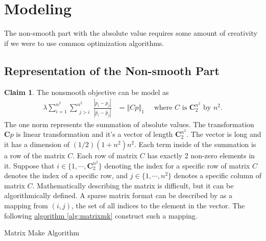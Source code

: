 \documentclass[11pt]{article}
\theoremstyle{definition}
\newtheorem{claim}{Claim}[subsection]
\numberwithin{equation}{subsection}
\begin{document}
\section{Modeling}
    
    The non-smooth part with the absolute value requires some amount of creativity if we were to use common optimization algorithms. 
    \subsection{Representation of the Non-smooth Part}\label{sec:opsplit_model}
        \begin{claim}
            The nonsmooth objective can be model as 
            \begin{align*}
                \lambda \sum_{i=1}^{n^2}\sum_{\substack{j> i}}^{n^2}
                \frac{|p_{i} - p_j|}{|\hat p_{i} - \hat p_j|}
                &= 
                \left\Vert
                    Cp
                \right\Vert_1 \quad 
                \text{ where $C$ is $\mathbf C_2^{n^2}$ by $n^2$}. 
            \end{align*}
            The one norm represents the summation of absolute values. 
            The transformation $\mathbf Cp$ is linear transformation and it's a vector of length $\mathbf C_2^{n^2}$. 
            The vector is long and it has a dimension of $(1/2)(1 +n^2)n^2$. 
            Each term inside of the summation is a row of the matrix $C$. 
            Each row of matrix $C$ has exactly 2 non-zero elements in it. 
            Suppose that $i\in \{1,\cdots,\mathbf C^{n^2}_2\}$ denoting the index for a specific row of matrix $C$ denotes the index of a specific row, and $j\in \{1, \cdots, n^2\}$ denotes a specific column of matrix $C$. 
            Mathematically describing the matrix is difficult, but it can be algorithmically defined.
            A sparse matrix format can be described by as a mapping from $(i,j)$, the set of all indices to the element in the vector. 
            The following 
            \hyperref[alg:matrixmk]{algorithm \ref{alg:matrixmk}}
            construct such a mapping. 
            \begin{algorithm}[H]
                \begin{algorithmic}[1]
                        \ENDIF
                    \ENDFOR
                \ENDFOR
                \end{algorithmic}
                \caption{Matrix Make Algorithm}
                \label{alg:matrixmk}
            \end{algorithm}
            
        \end{claim}
\end{document}
